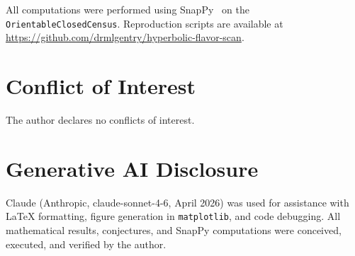 \documentclass[12pt]{article}
\theoremstyle{definition}
\begin{document}
All computations were performed using SnapPy~\cite{SnapPy}
on the \texttt{OrientableClosedCensus}. Reproduction scripts are
available at
\url{https://github.com/drmlgentry/hyperbolic-flavor-scan}.

\section*{Conflict of Interest}

The author declares no conflicts of interest.


\section*{Generative AI Disclosure}
Claude (Anthropic, claude-sonnet-4-6, April 2026) was used for
assistance with \LaTeX{} formatting, figure generation in
\texttt{matplotlib}, and code debugging. All mathematical results,
conjectures, and SnapPy computations were conceived, executed, and
verified by the author.
\end{document}
